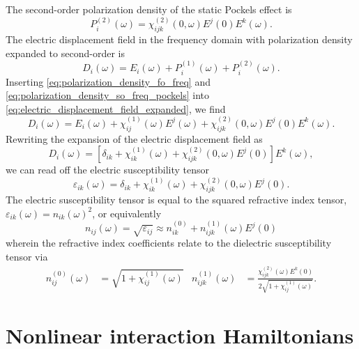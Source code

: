 The second-order polarization density of the static Pockels effect is~\cite[p.~495]{Boyd2020}
\begin{equation}
	P_i^{(2)}(\omega)
	=
	\chi^{(2)}_{ijk}(0,\omega)
	E^j(0)
	E^k(\omega)
	.
	\label{eq:polarization_density_so_freq_pockels}
\end{equation}
The electric displacement field in the frequency domain with polarization density expanded to second-order is~\cite[p.~1070]{Mandel1995}
\begin{equation}
	D_i(\omega)
	=
	E_i(\omega)
	+
	P_i^{(1)}(\omega)
	+
	P_i^{(2)}(\omega)
	.
	\label{eq:electric_displacement_field_expanded}
\end{equation}
Inserting \cref{eq:polarization_density_fo_freq} and \cref{eq:polarization_density_so_freq_pockels} into \cref{eq:electric_displacement_field_expanded}, we find
\begin{equation}
	D_i(\omega)
	=
	E_i(\omega)
	+
	\chi^{(1)}_{ij}(\omega)
	E^j(\omega)
	+
	\chi^{(2)}_{ijk}(0,\omega)
	E^j(0)
	E^k(\omega)
	.
\end{equation}
Rewriting the expansion of the electric displacement field as
\begin{equation}
	D_i(\omega)
	=
	\left[
		\delta_{ik}
		+
		\chi^{(1)}_{ik}(\omega)
		+
		\chi^{(2)}_{ijk}(0,\omega)
		E^j(0)
	\right]
	E^k(\omega)
	,
\end{equation}
we can read off the electric susceptibility tensor
\begin{equation}
	\varepsilon_{ik}(\omega)
	=
	\delta_{ik}
	+
	\chi^{(1)}_{ik}(\omega)
	+
	\chi^{(2)}_{ijk}(0,\omega)
	E^j(0)
	.
\end{equation}
The electric susceptibility tensor is equal to the squared refractive index tensor, $\varepsilon_{ik}(\omega)=n_{ik}(\omega)^2$, or equivalently~\cite[p.~3]{Brooker2003}
\begin{equation}
	n_{ij}(\omega)
	=
	\sqrt{\varepsilon_{ij}}
	\approx
	n_{ik}^{(0)}
	+
	n_{ijk}^{(1)}(\omega)
	E^j(0)
\end{equation}
wherein the refractive index coefficients relate to the dielectric susceptibility tensor via~\cite{Rerat2020}
\begin{align}
	n^{(0)}_{ij}(\omega)
	&=
	\sqrt{1+\chi^{(1)}_{ij}(\omega)}
	&
	n^{(1)}_{ijk}(\omega)
	&=
	\frac{\chi^{(2)}_{ijk}(\omega)
	E^k(0)}{2\sqrt{1+\chi^{(1)}_{ij}(\omega)}}
	.
\end{align}

\section{Nonlinear interaction Hamiltonians}

